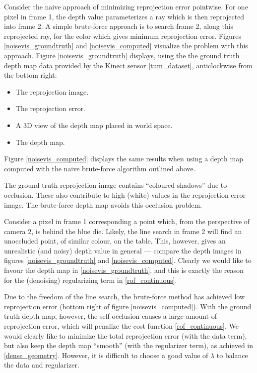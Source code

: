 \documentclass[conference]{IEEEtran}
\begin{document}
Consider the naive approach of minimizing reprojection error pointwise. For one pixel in frame 1, the depth value parameterizes a ray which
is then reprojected into frame 2. A simple brute-force approach is to search frame 2, along this reprojected ray, for the color which gives minimum
reprojection error.
Figures \ref{noisevis_groundtruth} and \ref{noisevis_computed} visualize the problem with this approach.
Figure \ref{noisevis_groundtruth} displays, using the the ground truth depth map data provided by the Kinect sensor \ref{tum_dataset}, anticlockwise
from the bottom right:
\begin{itemize}
    \item The reprojection image.
    \item The reprojection error.
    \item A 3D view of the depth map placed in world space.
    \item The depth map.
\end{itemize}
Figure \ref{noisevis_computed} displays the same results when using a depth map computed with the naive brute-force algorithm outlined above.

The ground truth reprojection image contains ``coloured shadows'' due to occlusion. These also contribute
to high (white) values in the reprojection error image. The brute-force depth map avoids this occlusion problem.

Consider a pixel in frame 1 corresponding a point which, from the perspective of camera 2, is behind the blue die.
Likely, the line search in frame 2 will find
an unoccluded point, of similar colour, on the table. This, however, gives an unrealistic (and noisy) depth value in general --- compare
the depth images in figures \ref{noisevis_groundtruth} and \ref{noisevis_computed}. Clearly we would like to favour the depth map in
\eqref{noisevis_groundtruth}, and this is exactly the reason for the (denoising) regularizing term in \eqref{rof_continuous}.

Due to the freedom of the line search, the brute-force method has achieved low reprojection error (bottom right of figure \ref{noisevis_computed}).
With the ground truth depth map, however, the self-occlusion causes a large amount of reprojection error, which will penalize the cost function
\eqref{rof_continuous}. We would clearly like to minimize the total reprojection error (with the data term), but also keep the depth map ``smooth'' (with the regularizer term), as achieved in \ref{dense_geometry}.
However, it is difficult to choose a good value of $\lambda$ to balance the data and regularizer.
\end{document}
